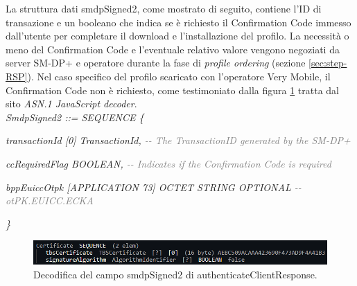 \documentclass[10pt, oneside]{book}
\begin{document}
\noindent La struttura dati smdpSigned2, come mostrato di seguito, contiene l'ID di transazione e un booleano che indica se è richiesto il Confirmation Code immesso dall'utente per completare il download e l'installazione del profilo. La necessità o meno del Confirmation Code e l'eventuale relativo valore vengono negoziati da server SM-DP+ e operatore durante la fase di \textit{profile ordering} (sezione \ref{sec:step-RSP}). Nel caso specifico del profilo scaricato con l'operatore Very Mobile, il Confirmation Code non è richiesto, come testimoniato dalla figura \ref{fig:decode-smdpSigned2} tratta dal sito \textit{ASN.1 JavaScript decoder}.\\

\textit{SmdpSigned2 ::= SEQUENCE \{}

\hspace{0.75cm} \textit{transactionId [0] TransactionId, \textcolor{gray}{{-}{-} The TransactionID generated by the SM-DP+}}

\hspace{0.75cm} \textit{ccRequiredFlag BOOLEAN, \textcolor{gray}{{-}{-} Indicates if the Confirmation Code is required}}

\hspace{0.75cm} \textit{bppEuiccOtpk [APPLICATION 73] OCTET STRING OPTIONAL \textcolor{gray}{{-}{-} otPK.EUICC.ECKA}}

\textit{\}\\}

\begin{figure}
\includegraphics[width=\linewidth]{decode-smdpSigned2.png}
\caption{Decodifica del campo smdpSigned2 di authenticateClientResponse.}
\label{fig:decode-smdpSigned2}
\end{figure}
\end{document}
